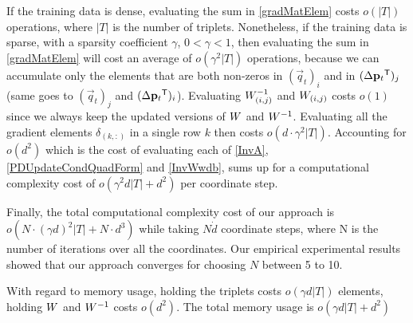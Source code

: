 \documentclass{article}
\begin{document}
If the training data is dense, evaluating the sum in \eqref{gradMatElem} costs $o(|T|)$ operations, where $|T|$ is the number of triplets. Nonetheless, if the training data is sparse, with a sparsity coefficient $\gamma$,  $ 0< \gamma <1 $, then evaluating the sum in \eqref{gradMatElem} will cost an average of $o(\gamma^2 |T|)$ operations, because we can accumulate only the elements that are both non-zeros in $(\vec{q}_{t})_i$ and in $(\Delta\mathbf{p}_{t}{}^\mathsf{T})_j  $ (same goes to $(\vec{q}_{t})_j$ and $(\Delta\mathbf{p}_{t}{}^\mathsf{T})_i$). Evaluating ${W}^{-1}_{(i,j)}$ and ${W}_{(i,j)}$ costs $o(1)$ since we always keep the updated versions of ${W}$ and ${W}^{-1}$. Evaluating all the gradient elements $\delta_{(k,:)}$ in a single row $k$ then costs $o(d\cdot \gamma^2 |T|)$. Accounting for $o(d^2)$ which is the cost of evaluating each of \eqref{InvA}, \eqref{PDUpdateCondQuadForm} and \eqref{InvWwdb}, sums up for a computational complexity cost of $o(\gamma^2 d |T| + d^2)$ per coordinate step.

Finally, the total computational complexity cost of our approach is $o(N \cdot (\gamma d)^2 |T| + N \cdot d^3)$ while taking $N \dot d$ coordinate steps, where N is the number of iterations over all the coordinates. Our empirical experimental results showed that our approach converges for choosing $N$ between 5 to 10. 

With regard to memory usage, holding the triplets costs $o(\gamma d |T|)$ elements, holding ${W}$ and ${W}^{-1}$ costs $o(d^2)$. The total memory usage is $o(\gamma d |T| + d^2)$
\end{document}
